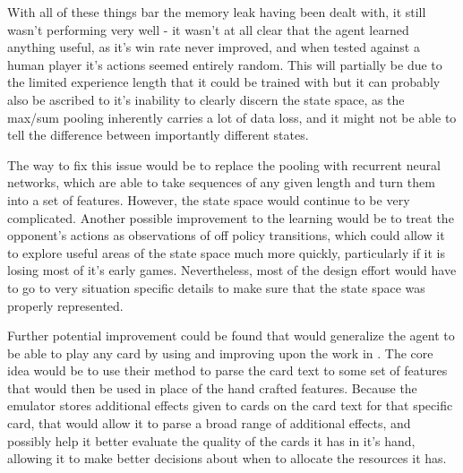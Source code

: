 With all of these things bar the memory leak having been dealt with, it still wasn't performing very well - it wasn't at all clear that the agent learned anything useful, as it's win rate never improved, and when tested against a human player it's actions seemed entirely random. This will partially be due to the limited experience length that it could be trained with but it can probably also be ascribed to it's inability to clearly discern the state space, as the max/sum pooling inherently carries a lot of data loss, and it might not be able to tell the difference between importantly different states.

The way to fix this issue would be to replace the pooling with recurrent neural networks, which are able to take sequences of any given length and turn them into a set of features. However, the state space would continue to be very complicated. Another possible improvement to the learning would be to treat the opponent's actions as observations of off policy transitions, which could allow it to explore useful areas of the state space much more quickly, particularly if it is losing most of it's early games. Nevertheless, most of the design effort would have to go to very situation specific details to make sure that the state space was properly represented.

Further potential improvement could be found that would generalize the agent to be able to play any card by using and improving upon the work in \cite{ling2016latent}. The core idea would be to use their method to parse the card text to some set of features that would then be used in place of the hand crafted features. Because the emulator stores additional effects given to cards on the card text for that specific card, that would allow it to parse a broad range of additional effects, and possibly help it better evaluate the quality of the cards it has in it's hand, allowing it to make better decisions about when to allocate the resources it has.